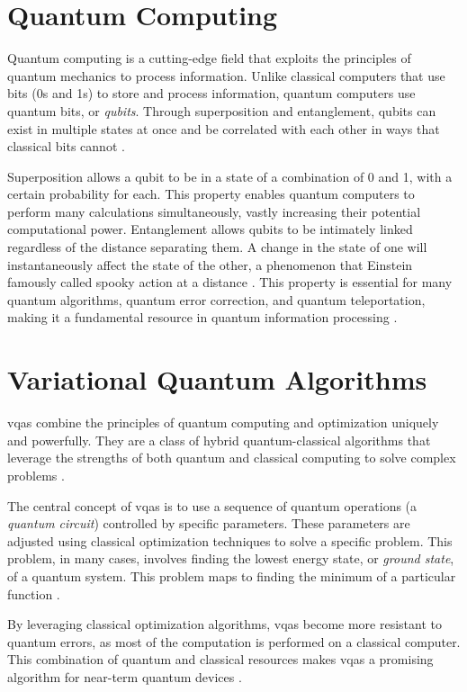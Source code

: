 \documentclass[
  a4paper,  %
  twoside,  %
  bibliography=totoc,
  headsepline,
  cleardoublepage=empty,
  parskip=half,
  draft=false
]{scrbook}
\begin{document}
\section{Quantum Computing}
\label{sec:quantumComputing}
Quantum computing is a cutting-edge field that exploits the principles of quantum mechanics to process information.
Unlike classical computers that use bits (0s and 1s) to store and process information, quantum computers use quantum bits, or \emph{qubits}.
Through superposition and entanglement, qubits can exist in multiple states at once and be correlated with each other in ways that classical bits cannot \cite{Nielsen2010}.

Superposition allows a qubit to be in a state of a combination of 0 and 1, with a certain probability for each.
This property enables quantum computers to perform many calculations simultaneously, vastly increasing their potential computational power.
Entanglement allows qubits to be intimately linked regardless of the distance separating them.
A change in the state of one will instantaneously affect the state of the other, a phenomenon that Einstein famously called spooky action at a distance \cite{Einstein1935}.
This property is essential for many quantum algorithms, quantum error correction, and quantum teleportation, making it a fundamental resource in quantum information processing \cite{Nielsen2010, Preskill1998}.


\section{Variational Quantum Algorithms}
\label{sec:variationalQuantumAlgorithms}

\glspl{vqa} combine the principles of quantum computing and optimization uniquely and powerfully.
They are a class of hybrid quantum-classical algorithms that leverage the strengths of both quantum and classical computing to solve complex problems \cite{McClean2016}.

The central concept of \glspl{vqa} is to use a sequence of quantum operations (a \emph{quantum circuit}) controlled by specific parameters.
These parameters are adjusted using classical optimization techniques to solve a specific problem.
This problem, in many cases, involves finding the lowest energy state, or \emph{ground state}, of a quantum system.
This problem maps to finding the minimum of a particular function \cite{Peruzzo2013}.

By leveraging classical optimization algorithms, \glspl{vqa} become more resistant to quantum errors, as most of the computation is performed on a classical computer.
This combination of quantum and classical resources makes \glspl{vqa} a promising algorithm for near-term quantum devices \cite{Moll2017}.
\end{document}
